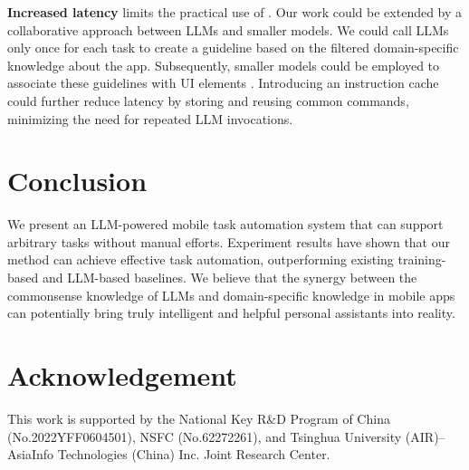 \textbf{Increased latency} limits the practical use of \name. Our work could be extended by a collaborative approach between LLMs and smaller models. %
We could call LLMs only once for each task to create a guideline based on the filtered domain-specific knowledge about the app. Subsequently, smaller models could be employed to associate these guidelines with UI elements \cite{seq2act, metagui}. %
 Introducing an instruction cache could further reduce latency by storing and reusing common commands, minimizing the need for repeated LLM invocations.
\vspace{-0.25cm}
\section{Conclusion}
We present an LLM-powered mobile task automation system that can support arbitrary tasks without manual efforts.
Experiment results have shown that our method can achieve effective task automation, outperforming existing training-based and LLM-based baselines.
We believe that the synergy between the commonsense knowledge of LLMs and domain-specific knowledge in mobile apps can potentially bring truly intelligent and helpful personal assistants into reality.
\section*{Acknowledgement}
\label{sec:acknowledgement}
This work is supported by the National Key R\&D Program of China (No.2022YFF0604501), NSFC (No.62272261), and Tsinghua University (AIR)--AsiaInfo Technologies (China) Inc. Joint Research Center.

\balance

